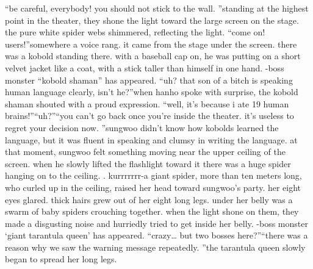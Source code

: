 “be careful, everybody! you should not stick to the wall.
”standing at the highest point in the theater, they shone the light toward the large screen on the stage.
the pure white spider webs shimmered, reflecting the light.
“come on! users!”somewhere a voice rang.
 it came from the stage under the screen.
 there was a kobold standing there.
with a baseball cap on, he was putting on a short velvet jacket like a coat, with a stick taller than himself in one hand.
-boss monster “kobold shaman” has appeared.
“uh? that son of a bitch is speaking human language clearly, isn’t he?”when hanho spoke with surprise, the kobold shaman shouted with a proud expression.
“well, it’s because i ate 19 human brains!”“uh?”“you can’t go back once you’re inside the theater.
 it’s useless to regret your decision now.
”sungwoo didn’t know how kobolds learned the language, but it was fluent in speaking and clumsy in writing the language.
at that moment, sungwoo felt something moving near the upper ceiling of the screen.
 when he slowly lifted the flashlight toward it there was a huge spider hanging on to the ceiling.
.
kurrrrrrr-a giant spider, more than ten meters long, who curled up in the ceiling, raised her head toward sungwoo’s party.
 her eight eyes glared.
 thick hairs grew out of her eight long legs.
under her belly was a swarm of baby spiders crouching together.
 when the light shone on them, they made a disgusting noise and hurriedly tried to get inside her belly.
-boss monster ‘giant tarantula queen’ has appeared.
“crazy… but two bosses here?”“there was a reason why we saw the warning message repeatedly.
”the tarantula queen slowly began to spread her long legs.

